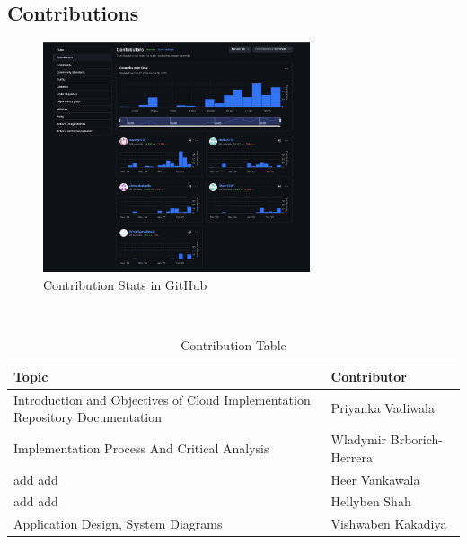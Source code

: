 \documentclass{llncs}
\begin{document}
\subsection{Contributions}
\begin{figure}[htbp]
    \centering
    \includegraphics[width=0.7\textwidth]{../images/contributions.png}
    \vspace{0.01\textwidth}
    \caption{Contribution Stats in GitHub}
    \label{fig:contributions}
\end{figure}

\vphantom{}\\

\begin{table}[htbp]

    \begin{tabular}{|p{}|p{}|}
        \hline
        \textbf{Topic}    & \textbf{Contributor}      \\
        \hline
        Introduction and Objectives of Cloud Implementation  \newline
        Repository Documentation & Priyanka Vadiwala         \\
        \hline
        Implementation Process  And Critical Analysis
                       & Wladymir Brborich-Herrera \\
        \hline
        add \newline
        add               & Heer Vankawala            \\
        \hline
        add \newline
        add               & Hellyben Shah             \\
        \hline
        Application Design, System Diagrams              & Vishwaben Kakadiya        \\
        \hline
    \end{tabular}
    \caption{Contribution Table}
    \label{tab:contribution}
\end{table}
\end{document}
